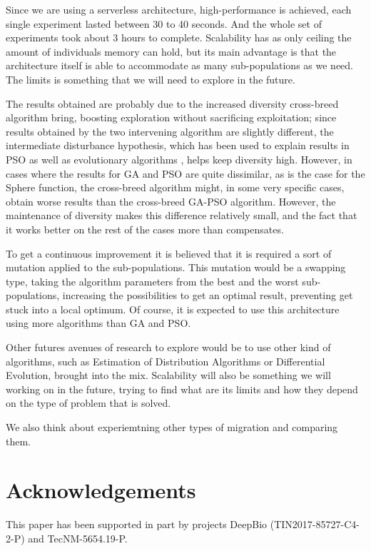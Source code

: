 \documentclass[runningheads]{llncs}
\begin{document}
Since we are using a serverless architecture, high-performance is
achieved, each single experiment lasted between 30 to 40 seconds.
And the whole set of experiments took about 3 hours to complete.
Scalability has as only ceiling the amount of individuals memory can
hold, but its main advantage is that the architecture itself is able
to accommodate as many sub-populations as we need. The limits is
something that we will need to explore in the future. 

The results obtained are probably due to the increased diversity
cross-breed algorithm bring, boosting exploration without sacrificing
exploitation; since results obtained by 
the two intervening algorithm are slightly different, the intermediate
disturbance hypothesis, which has been used to explain results in PSO
\cite{gao2013particle} as well as evolutionary algorithms
\cite{merelo2008testing},  helps keep diversity high. However, in
cases 
where the results for GA and PSO are quite dissimilar, as is the case
for the Sphere function, the cross-breed algorithm might, in some very
specific cases, obtain worse results than the cross-breed  GA-PSO
algorithm. However, the maintenance of diversity makes this difference
relatively small, and the fact that it works better on the rest of the
cases more than compensates.

To get a continuous improvement it is believed that it is required a sort of
mutation applied to the sub-populations. This mutation would be a swapping type,
taking the algorithm parameters from the best and the worst sub-populations,
increasing the possibilities to get an optimal result, preventing get stuck into
a local optimum. Of course, it is expected to use this architecture using more
algorithms than GA and PSO.

Other futures avenues of research to explore would be to use other
kind of algorithms, such as Estimation of Distribution Algorithms or
Differential Evolution, brought into the mix. Scalability will also be
something we will working on in the future, trying to find what are
its limits and how they depend on the type of problem that is solved.

We also think about experiemtning other types of migration and comparing them. 


\section*{Acknowledgements}

This paper has been supported in part by projects DeepBio (TIN2017-85727-C4-2-P) and 
TecNM-5654.19-P.



  
\end{document}
